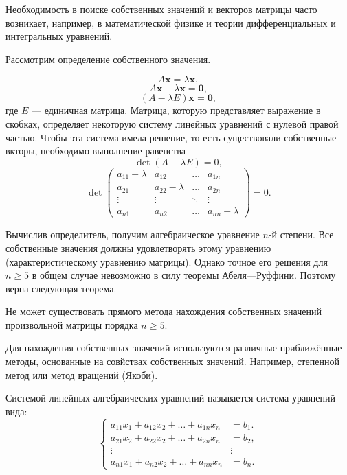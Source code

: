 Необходимость в поиске собственных значений и векторов матрицы часто
возникает, например, в математической физике и теории дифференциальных
и интегральных уравнений.

Рассмотрим определение собственного значения.

\[
A\mathbf{x}=\lambda\mathbf{x},
\]
\[
A\mathbf{x}-\lambda\mathbf{x}=\mathbf{0},
\]
\[
(A-\lambda E)\mathbf{x}=\mathbf{0},
\]
где $E$ — единичная матрица. Матрица, которую представляет выражение
в скобках, определяет некоторую систему линейных уравнений с нулевой
правой частью. Чтобы эта система имела решение, то есть существовали
собственные вкторы, необходимо выполнение равенства
\[
\det(A-\lambda E)=0,
\]
\[
\det\begin{pmatrix}a_{11}-\lambda & a_{12} & \dots & a_{1n}\\
a_{21} & a_{22}-\lambda & \dots & a_{2n}\\
\vdots & \vdots & \ddots & \vdots\\
a_{n1} & a_{n2} & \ldots & a_{nn}-\lambda
\end{pmatrix}=0.
\]


Вычислив определитель, получим алгебраическое уравнение $n$-й степени.
Все собственные значения должны удовлетворять этому уравнению (характеристическому
уравнению матрицы). Однако точное его решения для $n\geqslant5$ в
общем случае невозможно в силу теоремы Абеля—Руффини. Поэтому верна
следующая теорема.
\begin{thm}
Не может существовать прямого метода нахождения собственных значений
произвольной матрицы порядка $n\geqslant5$.
\end{thm}
Для нахождения собственных значений используются различные приближённые
методы, основанные на совйствах собственных значений. Например, степенной
метод или метод вращений (Якоби).



Системой линейных алгебраических уравнений называется система уравнений
вида:
\[
\begin{cases}
a_{11}x_{1}+a_{12}x_{2}+\ldots+a_{1n}x_{n} & =b_{1}.\\
a_{21}x_{2}+a_{22}x_{2}+\ldots+a_{2n}x_{n} & =b_{2},\\
\vdots & \vdots\\
a_{n1}x_{1}+a_{n2}x_{2}+\ldots+a_{nn}x_{n} & =b_{n}.
\end{cases}
\]


